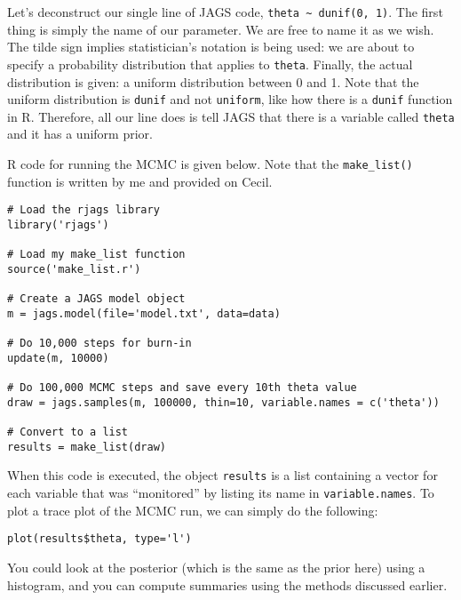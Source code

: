 Let's deconstruct our single line of JAGS code, {\tt theta \~{ } dunif(0, 1)}. The
first thing is simply the name of our parameter. We are free to name it as we
wish. The tilde sign implies statistician's notation is being used: we are
about to specify a probability distribution that applies to {\tt theta}. Finally,
the actual distribution is given: a uniform distribution between 0 and 1. Note
that the uniform distribution is {\tt dunif} and not {\tt uniform}, like how
there is a {\tt dunif} function in R. Therefore, all our line does is tell JAGS
that there is a variable called {\tt theta} and it has a uniform prior.

R code for running the MCMC is given below. Note that the {\tt make\_list()}
function is written by me and provided on Cecil.

\begin{framed}
\begin{verbatim}
# Load the rjags library
library('rjags')

# Load my make_list function
source('make_list.r')

# Create a JAGS model object
m = jags.model(file='model.txt', data=data)

# Do 10,000 steps for burn-in
update(m, 10000)

# Do 100,000 MCMC steps and save every 10th theta value
draw = jags.samples(m, 100000, thin=10, variable.names = c('theta'))

# Convert to a list
results = make_list(draw)
\end{verbatim}
\end{framed}

When this code is executed, the object {\tt results} is a list containing a
vector for each variable that was ``monitored'' by listing its name in
{\tt variable.names}. To plot a trace plot of the MCMC run, we can simply do
the following:
\begin{framed}
\begin{verbatim}
plot(results$theta, type='l')
\end{verbatim}
\end{framed}
You could look at the posterior (which is the same as the prior here) using a
histogram, and you can compute summaries using the methods discussed earlier.

